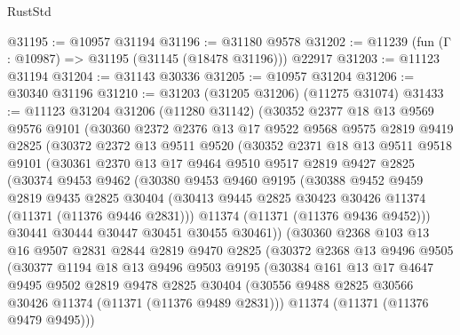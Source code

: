 \begin{lexlean}{RustStd}
\begin{coremodule}
@31195 := @10957 @31194
@31196 := @31180 @9578
@31202 := @11239 (fun (Γ : @10987) => @31195 (@31145 (@18478 @31196))) @22917
@31203 := @11123 @31194
@31204 := @31143 @30336
@31205 := @10957 @31204
@31206 := @30340 @31196
@31210 := @31203 (@31205 @31206) (@11275 @31074)
@31433 := @11123
    @31204
    @31206
    (@11280 @31142)
    (@30352
      @2377
      @18
      @13
      @9569
      @9576
      @9101
      (@30360
        @2372
        @2376
        @13
        @17
        @9522
        @9568
        @9575
        @2819
        @9419
        @2825
        (@30372
          @2372
          @13
          @9511
          @9520
          (@30352
            @2371
            @18
            @13
            @9511
            @9518
            @9101
            (@30361
              @2370
              @13
              @17
              @9464
              @9510
              @9517
              @2819
              @9427
              @2825
              (@30374
                @9453
                @9462
                (@30380
                  @9453
                  @9460
                  @9195
                  (@30388
                    @9452
                    @9459
                    @2819
                    @9435
                    @2825
                    @30404
                    (@30413 @9445 @2825 @30423 @30426 @11374 (@11371 (@11376 @9446 @2831)))
                    @11374
                    (@11371 (@11376 @9436 @9452)))
                  @30441
                  @30444
                  @30447
                  @30451
                  @30455
                  @30461))
              (@30360
                @2368
                @103
                @13
                @16
                @9507
                @2831
                @2844
                @2819
                @9470
                @2825
                (@30372
                  @2368
                  @13
                  @9496
                  @9505
                  (@30377
                    @1194
                    @18
                    @13
                    @9496
                    @9503
                    @9195
                    (@30384
                      @161
                      @13
                      @17
                      @4647
                      @9495
                      @9502
                      @2819
                      @9478
                      @2825
                      @30404
                      (@30556 @9488 @2825 @30566 @30426 @11374 (@11371 (@11376 @9489 @2831)))
                      @11374
                      (@11371 (@11376 @9479 @9495)))

\end{coremodule}
\end{lexlean}
